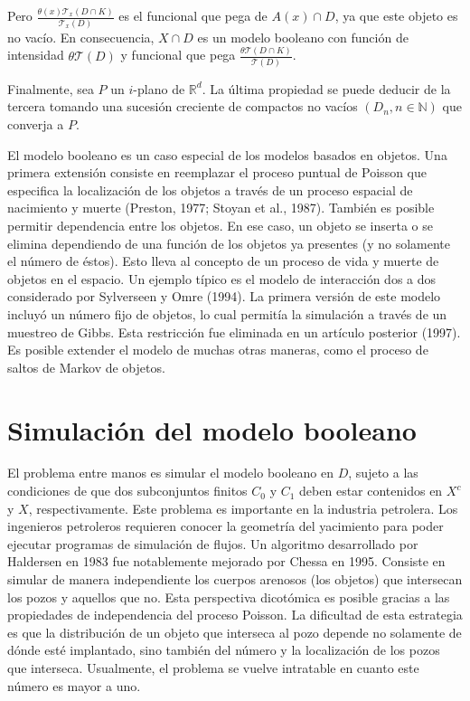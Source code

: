 Pero $\frac{\theta(x)\mathcal{T}_x(D\cap K)}{\mathcal{T}_x(D)}$ es el funcional que pega de $A(x)\cap D$, ya que este objeto es no vac\'io. En consecuencia, $X\cap D$ es un modelo booleano con funci\'on de intensidad $\theta\mathcal{T}(D)$ y funcional que pega $\frac{\theta\mathcal{T}(D\cap K)}{\mathcal{T}(D)}$.

Finalmente, sea $P$ un $i$-plano de $\mathbb{R}^d$. La \'ultima propiedad se puede deducir de la tercera tomando una sucesi\'on creciente de compactos no vac\'ios $(D_n,n\in\mathbb{N})$ que converja a $P$.

El modelo booleano es un caso especial de los modelos basados en objetos. Una primera extensi\'on consiste en reemplazar el proceso puntual de Poisson que especifica la localizaci\'on de los objetos a trav\'es de un proceso espacial de nacimiento y muerte (Preston, 1977; Stoyan et al., 1987). Tambi\'en es posible permitir dependencia entre los objetos. En ese caso, un objeto se inserta o se elimina dependiendo de una funci\'on de los objetos ya presentes (y no solamente el n\'umero de \'estos). Esto lleva al concepto de un proceso de vida y muerte de objetos en el espacio. Un ejemplo t\'ipico es el modelo de interacci\'on dos a dos considerado por Sylverseen y Omre (1994). La primera versi\'on de este modelo incluy\'o un n\'umero fijo de objetos, lo cual permit\'ia la simulaci\'on a trav\'es de un muestreo de Gibbs. Esta restricci\'on fue eliminada en un art\'iculo posterior (1997). Es posible extender el modelo de muchas otras maneras, como el proceso de saltos de Markov de objetos.


\section{Simulaci\'on del modelo booleano}

El problema entre manos es simular el modelo booleano en $D$, sujeto a las condiciones de que dos subconjuntos finitos $C_0$ y $C_1$ deben estar contenidos en $X^c$ y $X$, respectivamente. Este problema es importante en la industria petrolera. Los ingenieros petroleros requieren conocer la geometr\'ia del yacimiento para poder ejecutar programas de simulaci\'on de flujos. Un algoritmo desarrollado por Haldersen en 1983 fue notablemente mejorado por Chessa en 1995. Consiste en simular de manera independiente los cuerpos arenosos (los objetos) que intersecan los pozos y aquellos que no. Esta perspectiva dicot\'omica es posible gracias a las propiedades de independencia del proceso Poisson. La dificultad de esta estrategia es que la distribuci\'on de un objeto que interseca al pozo depende no solamente de d\'onde est\'e implantado, sino tambi\'en del n\'umero y la localizaci\'on de los pozos que interseca. Usualmente, el problema se vuelve intratable en cuanto este n\'umero es mayor a uno.

